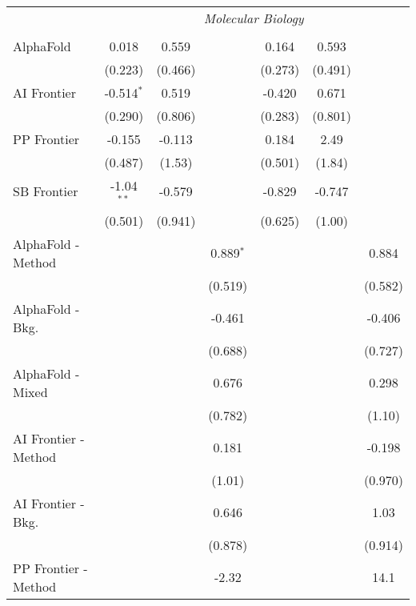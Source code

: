 \begin{tabular}{lcccccc}
 & \multicolumn{6}{c}{\textit{Molecular Biology}} \\ \\
   AlphaFold            & 0.018        & 0.559   &             & 0.164   & 0.593   &   \\   
                        & (0.223)      & (0.466) &             & (0.273) & (0.491) &   \\   
   AI Frontier          & -0.514$^{*}$ & 0.519   &             & -0.420  & 0.671   &   \\   
                        & (0.290)      & (0.806) &             & (0.283) & (0.801) &   \\   
   PP Frontier          & -0.155       & -0.113  &             & 0.184   & 2.49    &   \\   
                        & (0.487)      & (1.53)  &             & (0.501) & (1.84)  &   \\   
   SB Frontier          & -1.04$^{**}$ & -0.579  &             & -0.829  & -0.747  &   \\   
                        & (0.501)      & (0.941) &             & (0.625) & (1.00)  &   \\   
   AlphaFold - Method   &              &         & 0.889$^{*}$ &         &         & 0.884\\   
                        &              &         & (0.519)     &         &         & (0.582)\\   
   AlphaFold - Bkg.     &              &         & -0.461      &         &         & -0.406\\   
                        &              &         & (0.688)     &         &         & (0.727)\\   
   AlphaFold - Mixed    &              &         & 0.676       &         &         & 0.298\\   
                        &              &         & (0.782)     &         &         & (1.10)\\   
   AI Frontier - Method &              &         & 0.181       &         &         & -0.198\\   
                        &              &         & (1.01)      &         &         & (0.970)\\   
   AI Frontier - Bkg.   &              &         & 0.646       &         &         & 1.03\\   
                        &              &         & (0.878)     &         &         & (0.914)\\   
   PP Frontier - Method &              &         & -2.32       &         &         & 14.1\\   

\end{tabular}
